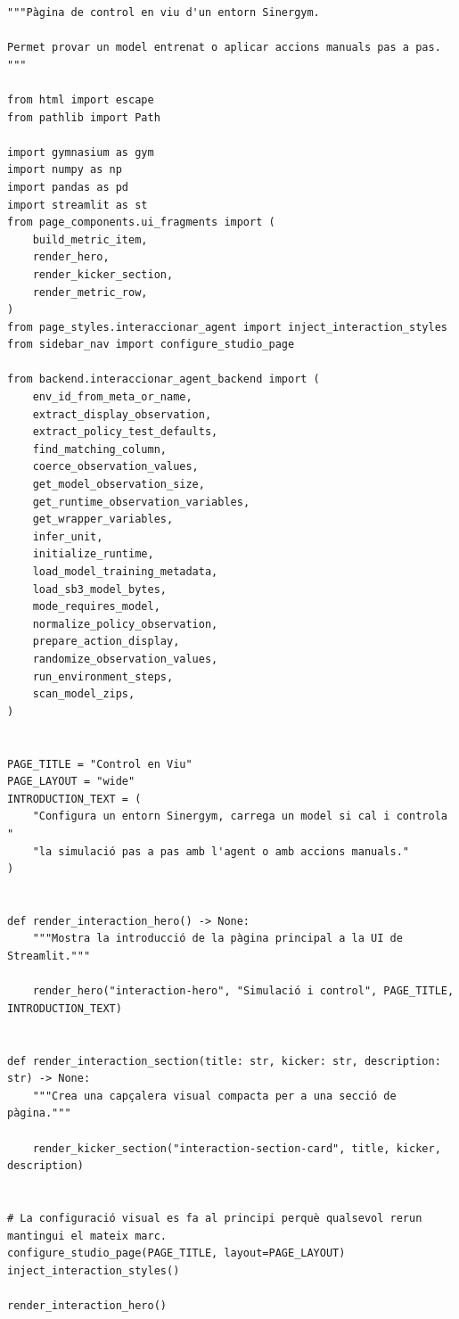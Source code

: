 \documentclass[10pt,a4paper]{article}
\begin{document}
\begin{lstlisting}[style=studioPython,caption={pages/Interaccionar\_amb\_l'Agent.py},label={lst:pages-interaccionar-amb-l-agent-py}]
"""Pàgina de control en viu d'un entorn Sinergym.

Permet provar un model entrenat o aplicar accions manuals pas a pas.
"""

from html import escape
from pathlib import Path

import gymnasium as gym
import numpy as np
import pandas as pd
import streamlit as st
from page_components.ui_fragments import (
    build_metric_item,
    render_hero,
    render_kicker_section,
    render_metric_row,
)
from page_styles.interaccionar_agent import inject_interaction_styles
from sidebar_nav import configure_studio_page

from backend.interaccionar_agent_backend import (
    env_id_from_meta_or_name,
    extract_display_observation,
    extract_policy_test_defaults,
    find_matching_column,
    coerce_observation_values,
    get_model_observation_size,
    get_runtime_observation_variables,
    get_wrapper_variables,
    infer_unit,
    initialize_runtime,
    load_model_training_metadata,
    load_sb3_model_bytes,
    mode_requires_model,
    normalize_policy_observation,
    prepare_action_display,
    randomize_observation_values,
    run_environment_steps,
    scan_model_zips,
)


PAGE_TITLE = "Control en Viu"
PAGE_LAYOUT = "wide"
INTRODUCTION_TEXT = (
    "Configura un entorn Sinergym, carrega un model si cal i controla "
    "la simulació pas a pas amb l'agent o amb accions manuals."
)


def render_interaction_hero() -> None:
    """Mostra la introducció de la pàgina principal a la UI de Streamlit."""

    render_hero("interaction-hero", "Simulació i control", PAGE_TITLE, INTRODUCTION_TEXT)


def render_interaction_section(title: str, kicker: str, description: str) -> None:
    """Crea una capçalera visual compacta per a una secció de pàgina."""

    render_kicker_section("interaction-section-card", title, kicker, description)


# La configuració visual es fa al principi perquè qualsevol rerun mantingui el mateix marc.
configure_studio_page(PAGE_TITLE, layout=PAGE_LAYOUT)
inject_interaction_styles()

render_interaction_hero()


\end{lstlisting}
\end{document}
